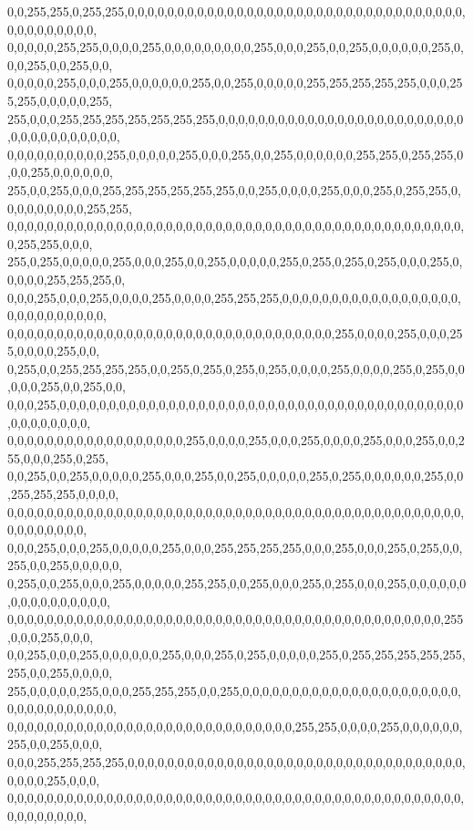 \begin{DoxyCode}
      0,0,255,255,0,255,255,0,0,0,0,0,0,0,0,0,0,0,0,0,0,0,0,0,0,0,0,0,0,0,0,0,0,0,0,0,0,0,0,0,0,0,0,0,0,0,0,0,0,0,
      0,0,0,0,0,255,255,0,0,0,0,255,0,0,0,0,0,0,0,0,0,255,0,0,0,255,0,0,255,0,0,0,0,0,0,255,0,0,0,255,0,0,255,0,0,
      0,0,0,0,0,255,0,0,0,255,0,0,0,0,0,0,255,0,0,255,0,0,0,0,0,255,255,255,255,255,0,0,0,255,255,0,0,0,0,0,255,
      255,0,0,0,255,255,255,255,255,255,255,0,0,0,0,0,0,0,0,0,0,0,0,0,0,0,0,0,0,0,0,0,0,0,0,0,0,0,0,0,0,0,0,0,0,0,0,
      0,0,0,0,0,0,0,0,0,0,255,0,0,0,0,0,255,0,0,0,255,0,0,255,0,0,0,0,0,0,255,255,0,255,255,0,0,0,255,0,0,0,0,0,0,
      255,0,0,255,0,0,0,255,255,255,255,255,255,0,0,255,0,0,0,0,255,0,0,0,255,0,255,255,0,0,0,0,0,0,0,0,0,255,255,
      0,0,0,0,0,0,0,0,0,0,0,0,0,0,0,0,0,0,0,0,0,0,0,0,0,0,0,0,0,0,0,0,0,0,0,0,0,0,0,0,0,0,0,0,0,0,0,255,255,0,0,0,
      255,0,255,0,0,0,0,0,255,0,0,0,255,0,0,255,0,0,0,0,0,255,0,255,0,255,0,255,0,0,0,255,0,0,0,0,0,255,255,255,0,
      0,0,0,255,0,0,0,255,0,0,0,0,255,0,0,0,0,255,255,255,0,0,0,0,0,0,0,0,0,0,0,0,0,0,0,0,0,0,0,0,0,0,0,0,0,0,0,0,
      0,0,0,0,0,0,0,0,0,0,0,0,0,0,0,0,0,0,0,0,0,0,0,0,0,0,0,0,0,0,0,0,0,255,0,0,0,0,255,0,0,0,255,0,0,0,0,255,0,0,
      0,255,0,0,255,255,255,255,0,0,255,0,255,0,255,0,255,0,0,0,0,255,0,0,0,0,255,0,255,0,0,0,0,0,255,0,0,255,0,0,
      0,0,0,255,0,0,0,0,0,0,0,0,0,0,0,0,0,0,0,0,0,0,0,0,0,0,0,0,0,0,0,0,0,0,0,0,0,0,0,0,0,0,0,0,0,0,0,0,0,0,0,0,0,
      0,0,0,0,0,0,0,0,0,0,0,0,0,0,0,0,0,0,255,0,0,0,0,255,0,0,0,255,0,0,0,0,255,0,0,0,255,0,0,255,0,0,0,255,0,255,
      0,0,255,0,0,255,0,0,0,0,0,255,0,0,0,255,0,0,255,0,0,0,0,0,255,0,255,0,0,0,0,0,0,255,0,0,255,255,255,0,0,0,0,
      0,0,0,0,0,0,0,0,0,0,0,0,0,0,0,0,0,0,0,0,0,0,0,0,0,0,0,0,0,0,0,0,0,0,0,0,0,0,0,0,0,0,0,0,0,0,0,0,0,0,0,0,0,0,
      0,0,0,255,0,0,0,255,0,0,0,0,0,255,0,0,0,255,255,255,255,0,0,0,255,0,0,0,255,0,255,0,0,255,0,0,255,0,0,0,0,0,
      0,255,0,0,255,0,0,0,255,0,0,0,0,0,255,255,0,0,255,0,0,0,255,0,255,0,0,0,255,0,0,0,0,0,0,0,0,0,0,0,0,0,0,0,0,
      0,0,0,0,0,0,0,0,0,0,0,0,0,0,0,0,0,0,0,0,0,0,0,0,0,0,0,0,0,0,0,0,0,0,0,0,0,0,0,0,0,0,0,0,255,0,0,0,255,0,0,0,
      0,0,255,0,0,0,255,0,0,0,0,0,0,255,0,0,0,255,0,255,0,0,0,0,0,255,0,255,255,255,255,255,255,0,0,255,0,0,0,0,
      255,0,0,0,0,0,255,0,0,0,255,255,255,0,0,255,0,0,0,0,0,0,0,0,0,0,0,0,0,0,0,0,0,0,0,0,0,0,0,0,0,0,0,0,0,0,0,0,0,
      0,0,0,0,0,0,0,0,0,0,0,0,0,0,0,0,0,0,0,0,0,0,0,0,0,0,0,0,0,255,255,0,0,0,0,255,0,0,0,0,0,0,255,0,0,255,0,0,0,
      0,0,0,255,255,255,255,0,0,0,0,0,0,0,0,0,0,0,0,0,0,0,0,0,0,0,0,0,0,0,0,0,0,0,0,0,0,0,0,0,0,0,0,0,0,255,0,0,0,
      0,0,0,0,0,0,0,0,0,0,0,0,0,0,0,0,0,0,0,0,0,0,0,0,0,0,0,0,0,0,0,0,0,0,0,0,0,0,0,0,0,0,0,0,0,0,0,0,0,0,0,0,0,0,

\end{DoxyCode}
